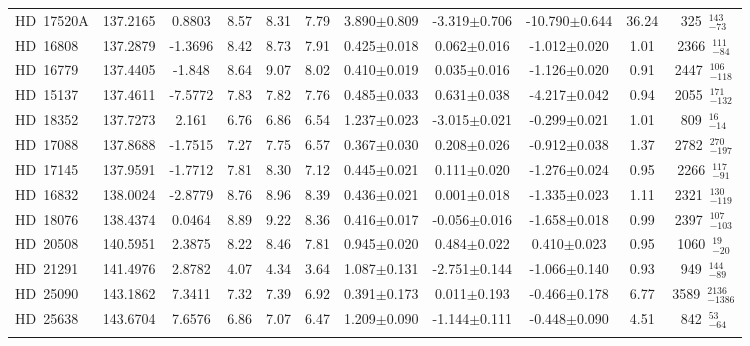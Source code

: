 {\begin{longtable}{lcccccccccc}
\noalign{\smallskip}
HD~17520A & 137.2165 & 0.8803 & 8.57 & 8.31 & 7.79 & 3.890$\pm$0.809 & -3.319$\pm$0.706 & -10.790$\pm$0.644 & 36.24 & 325~$_{-73}^{143}$ \\
\noalign{\smallskip}
HD~16808 & 137.2879 & -1.3696 & 8.42 & 8.73 & 7.91 & 0.425$\pm$0.018 & 0.062$\pm$0.016 & -1.012$\pm$0.020 & 1.01 & 2366~$_{-84}^{111}$ \\
\noalign{\smallskip}
HD~16779 & 137.4405 & -1.848 & 8.64 & 9.07 & 8.02 & 0.410$\pm$0.019 & 0.035$\pm$0.016 & -1.126$\pm$0.020 & 0.91 & 2447~$_{-118}^{106}$ \\
\noalign{\smallskip}
HD~15137 & 137.4611 & -7.5772 & 7.83 & 7.82 & 7.76 & 0.485$\pm$0.033 & 0.631$\pm$0.038 & -4.217$\pm$0.042 & 0.94 & 2055~$_{-132}^{171}$ \\
\noalign{\smallskip}
HD~18352 & 137.7273 & 2.161 & 6.76 & 6.86 & 6.54 & 1.237$\pm$0.023 & -3.015$\pm$0.021 & -0.299$\pm$0.021 & 1.01 & 809~$_{-14}^{16}$ \\
\noalign{\smallskip}
HD~17088 & 137.8688 & -1.7515 & 7.27 & 7.75 & 6.57 & 0.367$\pm$0.030 & 0.208$\pm$0.026 & -0.912$\pm$0.038 & 1.37 & 2782~$_{-197}^{270}$ \\
\noalign{\smallskip}
HD~17145 & 137.9591 & -1.7712 & 7.81 & 8.30 & 7.12 & 0.445$\pm$0.021 & 0.111$\pm$0.020 & -1.276$\pm$0.024 & 0.95 & 2266~$_{-91}^{117}$ \\
\noalign{\smallskip}
HD~16832 & 138.0024 & -2.8779 & 8.76 & 8.96 & 8.39 & 0.436$\pm$0.021 & 0.001$\pm$0.018 & -1.335$\pm$0.023 & 1.11 & 2321~$_{-119}^{130}$ \\
\noalign{\smallskip}
HD~18076 & 138.4374 & 0.0464 & 8.89 & 9.22 & 8.36 & 0.416$\pm$0.017 & -0.056$\pm$0.016 & -1.658$\pm$0.018 & 0.99 & 2397~$_{-103}^{107}$ \\
\noalign{\smallskip}
HD~20508 & 140.5951 & 2.3875 & 8.22 & 8.46 & 7.81 & 0.945$\pm$0.020 & 0.484$\pm$0.022 & 0.410$\pm$0.023 & 0.95 & 1060~$_{-20}^{19}$ \\
\noalign{\smallskip}
HD~21291 & 141.4976 & 2.8782 & 4.07 & 4.34 & 3.64 & 1.087$\pm$0.131 & -2.751$\pm$0.144 & -1.066$\pm$0.140 & 0.93 & 949~$_{-89}^{144}$ \\
\noalign{\smallskip}
HD~25090 & 143.1862 & 7.3411 & 7.32 & 7.39 & 6.92 & 0.391$\pm$0.173 & 0.011$\pm$0.193 & -0.466$\pm$0.178 & 6.77 & 3589~$_{-1386}^{2136}$ \\
\noalign{\smallskip}
HD~25638 & 143.6704 & 7.6576 & 6.86 & 7.07 & 6.47 & 1.209$\pm$0.090 & -1.144$\pm$0.111 & -0.448$\pm$0.090 & 4.51 & 842~$_{-64}^{53}$ \\
\noalign{\smallskip}

\end{longtable}}
